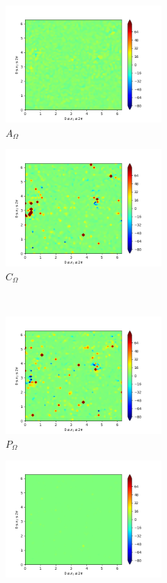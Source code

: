 \begin{figure}[H]
\begin{subfigure}{0.45\textwidth}
        \includegraphics[height=1.75in]{media/run-cds-65/A-enst-1440.png}
        \caption{$A_{\Omega}$}
    \end{subfigure}
    \newline
    \begin{subfigure}{0.45\textwidth}
        \includegraphics[height=1.75in]{media/run-cds-65/Pi-enst-1440.png}
        \caption{$C_{\Omega}$}
    \end{subfigure}
    ~
    \begin{subfigure}{0.45\textwidth}
        \includegraphics[height=1.75in]{media/run-cds-65/P-enst-1440.png}
        \caption{$P_{\Omega}$}
    \end{subfigure}
    \newline
    \begin{subfigure}{0.45\textwidth}
        \includegraphics[height=1.75in]{media/run-cds-65/B-enst-1440.png}

\end{subfigure}
\end{figure}
